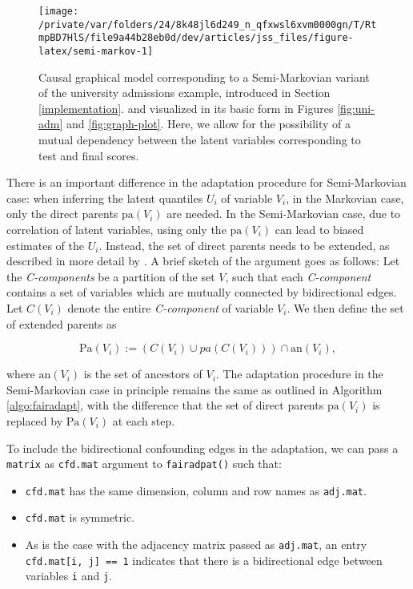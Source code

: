 \documentclass[
  nojss]{jss}
\providecommand{\tightlist}{%
  \setlength{\itemsep}{0pt}\setlength{\parskip}{0pt}}
\begin{document}
\begin{CodeChunk}
\begin{figure}

{\centering \texttt{[image: /private/var/folders/24/8k48jl6d249\_n\_qfxwsl6xvm0000gn/T/RtmpBD7HlS/file9a44b28eb0d/dev/articles/jss\_files/figure-latex/semi-markov-1]} 

}

\caption{Causal graphical model corresponding to a Semi-Markovian variant of the university admissions example, introduced in Section \ref{implementation}.  and visualized in its basic form in Figures \ref{fig:uni-adm} and \ref{fig:graph-plot}. Here, we allow for the possibility of a mutual dependency between the latent variables corresponding to test and final scores.}\label{fig:semi-markov}
\end{figure}
\end{CodeChunk}

There is an important difference in the adaptation procedure for
Semi-Markovian case: when inferring the latent quantiles \(U_i\) of
variable \(V_i\), in the Markovian case, only the direct parents
\(\mathrm{pa}(V_i)\) are needed. In the Semi-Markovian case, due to
correlation of latent variables, using only the \(\mathrm{pa}(V_i)\) can
lead to biased estimates of the \(U_i\). Instead, the set of direct
parents needs to be extended, as described in more detail by
\citet{tian2002general}. A brief sketch of the argument goes as follows:
Let the \emph{C-components} be a partition of the set \(V\), such that
each \emph{C-component} contains a set of variables which are mutually
connected by bidirectional edges. Let \(C(V_i)\) denote the entire
\emph{C-component} of variable \(V_i\). We then define the set of
extended parents as

\[\mathrm{Pa}(V_i) := (C(V_i) \cup pa(C(V_i))) \cap \mathrm{an}(V_i),\]

where \(\mathrm{an}(V_i)\) is the set of ancestors of \(V_i\). The
adaptation procedure in the Semi-Markovian case in principle remains the
same as outlined in Algorithm \ref{algo:fairadapt}, with the difference
that the set of direct parents \(\mathrm{pa}(V_i)\) is replaced by
\(\mathrm{Pa}(V_i)\) at each step.

To include the bidirectional confounding edges in the adaptation, we can
pass a \texttt{matrix} as \texttt{cfd.mat} argument to
\texttt{fairadpat()} such that:

\begin{itemize}
\tightlist
\item
  \texttt{cfd.mat} has the same dimension, column and row names as
  \texttt{adj.mat}.
\item
  \texttt{cfd.mat} is symmetric.
\item
  As is the case with the adjacency matrix passed as \texttt{adj.mat},
  an entry \texttt{cfd.mat{[}i,\ j{]}\ ==\ 1} indicates that there is a
  bidirectional edge between variables \texttt{i} and \texttt{j}.
\end{itemize}
\end{document}
